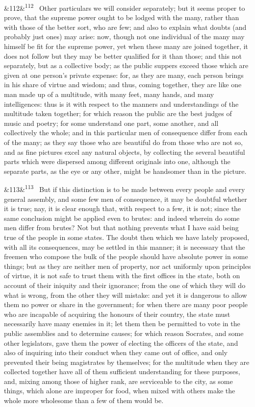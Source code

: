 \documentclass[12pt]{article}
\newcommand{\para}[1][]{\par\noindent\ifx&#1&\else\textsuperscript{\footnotesize #1}~\fi}
\begin{document}
\para[112] Other particulars we will consider separately; but it seems proper to prove, that the supreme power ought to be lodged with the many, rather than with those of the better sort, who are few; and also to explain what doubts (and probably just ones) may arise: now, though not one individual of the many may himself be fit for the supreme power, yet when these many are joined together, it does not follow but they may be better qualified for it than those; and this not separately, but as a collective body; as the public suppers exceed those which are given at one person's private expense: for, as they are many, each person brings in his share of virtue and wisdom; and thus, coming together, they are like one man made up of a multitude, with many feet, many hands, and many intelligences: thus is it with respect to the manners and understandings of the multitude taken together; for which reason the public are the best judges of music and poetry; for some understand one part, some another, and all collectively the whole; and in this particular men of consequence differ from each of the many; as they say those who are beautiful do from those who are not so, and as fine pictures excel any natural objects, by collecting the several beautiful parts which were dispersed among different originals into one, although the separate parts, as the eye or any other, might be handsomer than in the picture.

\para[113] But if this distinction is to be made between every people and every general assembly, and some few men of consequence, it may be doubtful whether it is true; nay, it is clear enough that, with respect to a few, it is not; since the same conclusion might be applied even to brutes: and indeed wherein do some men differ from brutes? Not but that nothing prevents what I have said being true of the people in some states. The doubt then which we have lately proposed, with all its consequences, may be settled in this manner; it is necessary that the freemen who compose the bulk of the people should have absolute power in some things; but as they are neither men of property, nor act uniformly upon principles of virtue, it is not safe to trust them with the first offices in the state, both on account of their iniquity and their ignorance; from the one of which they will do what is wrong, from the other they will mistake: and yet it is dangerous to allow them no power or share in the government; for when there are many poor people who are incapable of acquiring the honours of their country, the state must necessarily have many enemies in it; let them then be permitted to vote in the public assemblies and to determine causes; for which reason Socrates, and some other legislators, gave them the power of electing the officers of the state, and also of inquiring into their conduct when they came out of office, and only prevented their being magistrates by themselves; for the multitude when they are collected together have all of them sufficient understanding for these purposes, and, mixing among those of higher rank, are serviceable to the city, as some things, which alone are improper for food, when mixed with others make the whole more wholesome than a few of them would be.
\end{document}
